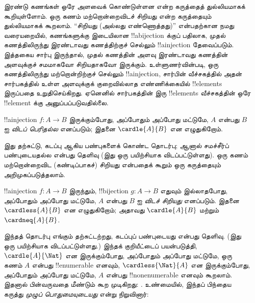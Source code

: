 \documentclass[../../../include/open-logic-section]{subfiles}
\begin{document}


\begin{explain}
இரண்டு கணங்கள் ஒரே அளவைக் கொண்டுள்ளன என்ற கருத்தைத்
துல்லியமாகக் கூறியுள்ளோம்.
ஒரு கணம் மற்றொன்றைவிடச் சிறியது என்ற கருத்தையும் துல்லியமாகக் கூறலாம்.
“சிறியது (அல்லது எண்ணொத்தது)” என்பதற்கான நமது வரையறையில்,
கணங்களுக்கு இடையிலான !!a{bijection} க்குப் பதிலாக,
முதல் கணத்திலிருந்து இரண்டாவது கணத்திற்குச் செல்லும்
!!a{injection} தேவைப்படும்.
இத்தகைய சார்பு இருந்தால், முதல் கணத்தின் அளவு இரண்டாவது கணத்தின்
அளவுக்குச் சமமாகவோ சிறியதாகவோ இருக்கும்.
உள்ளுணர்வின்படி, ஒரு கணத்திலிருந்து மற்றொன்றிற்குச் செல்லும்
!!a{injection}, சார்பின் வீச்சகத்தில் அதன் சார்பகத்தில் உள்ள அளவுக்குக்
குறைவில்லாத எண்ணிக்கையில் !!{element}s இருப்பதை உறுதிசெய்கிறது.
ஏனெனில் சார்பகத்தின் இரு !!{element}s வீச்சகத்தின் ஒரே
!!{element} க்கு அனுப்பப்படுவதில்லை.
\end{explain}

\begin{defn}
!!a{injection} $f \colon A \to B$ இருக்கும்போது,
அப்போதும் அப்போது மட்டுமே, $A$ என்பது $B$ ஐ
\emph{விடப் பெரிதல்ல} எனப்படும்; இதனை $\cardle{A}{B}$ என எழுதுகிறோம்.
\end{defn}

இது தற்சுட்டு, கடப்பு ஆகிய பண்புகளைக் கொண்ட தொடர்பு;
ஆனால் சமச்சீர்ப் பண்புடையதல்ல என்பது தெளிவு
(இது ஒரு பயிற்சியாக விடப்பட்டுள்ளது).
ஒரு கணம் மற்றொன்றைவிட (கண்டிப்பாகச்) சிறியது என்பதைக் கூறும்
ஒரு கருத்தையும் அறிமுகப்படுத்தலாம்.

\begin{defn}
!!a{injection} $f\colon A \to B$ இருந்தும்,
!!{bijection} $g\colon A
\to B$ எதுவும் இல்லாதபோது, அப்போதும் அப்போது மட்டுமே,
$A$ என்பது $B$ ஐ \emph{விடச் சிறியது} எனப்படும்.
இதனை $\cardless{A}{B}$ என எழுதுகிறோம்;
அதாவது $\cardle{A}{B}$ மற்றும் $\cardneq{A}{B}$.
\end{defn}

இந்தத் தொடர்பு எங்கும் தற்சுட்டற்றது, கடப்புப் பண்புடையது என்பது தெளிவு.
(இது ஒரு பயிற்சியாக விடப்பட்டுள்ளது.)
இந்தக் குறியீட்டைப் பயன்படுத்தி,
$\cardle{A}{\Nat}$ என இருக்கும்போது, அப்போதும் அப்போது மட்டுமே,
ஒரு கணம் $A$ என்பது !!{enumerable} எனவும்,
$\cardless{\Nat}{A}$ என இருக்கும்போது, அப்போதும் அப்போது மட்டுமே,
$A$ என்பது !!{nonenumerable} எனவும் கூறலாம்.
இதனால் பின்வருவதை மீண்டும் கூற முடிகிறது:
.
உண்மையில், இந்தப் பிந்தைய கருத்து \emph{முழுப் பொதுமையுடையது}
என்று \citet{Cantor1892} நிறுவினார்:
\end{document}
